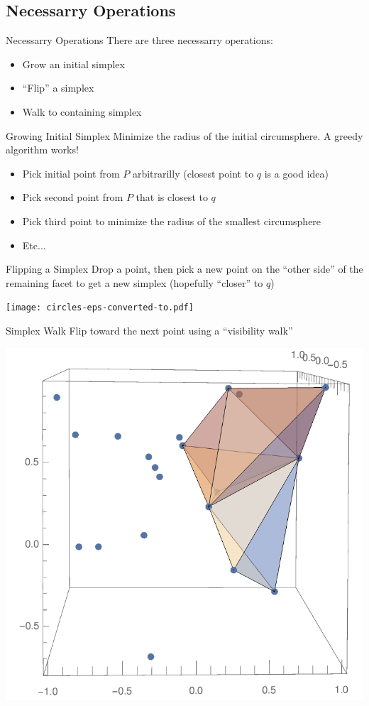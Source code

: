 \documentclass[xcolor=dvipsnames]{beamer}
\begin{document}
\subsection{Necessarry Operations}
\begin{frame}{Necessarry Operations}
There are three necessarry operations:
\pause
\begin{itemize}
\item Grow an initial simplex
\end{itemize}
\pause
\begin{itemize}
\item ``Flip'' a simplex
\end{itemize}
\pause
\begin{itemize}
\item Walk to containing simplex
\end{itemize}
\end{frame}
\begin{frame}{Growing Initial Simplex}
Minimize the radius of the initial circumsphere.
A greedy algorithm works!
\begin{itemize}
\item Pick initial point from $P$ arbitrarilly (closest point to $q$ is a 
good idea)
\item Pick second point from $P$ that is closest to $q$
\item Pick third point to minimize the radius of the smallest circumsphere
\item Etc...
\end{itemize}
\end{frame}
\begin{frame}{Flipping a Simplex}
Drop a point, then pick a new point on the ``other side'' of the remaining facet
to get a new simplex (hopefully ``closer'' to $q$)

\texttt{[image: circles-eps-converted-to.pdf]}
\end{frame}
\begin{frame}{Simplex Walk}
Flip toward the next point using a ``visibility walk''
\begin{center}
\includegraphics[width=0.5\columnwidth]{DelaunayWalk.pdf}
\end{center}
\end{frame}
\end{document}
